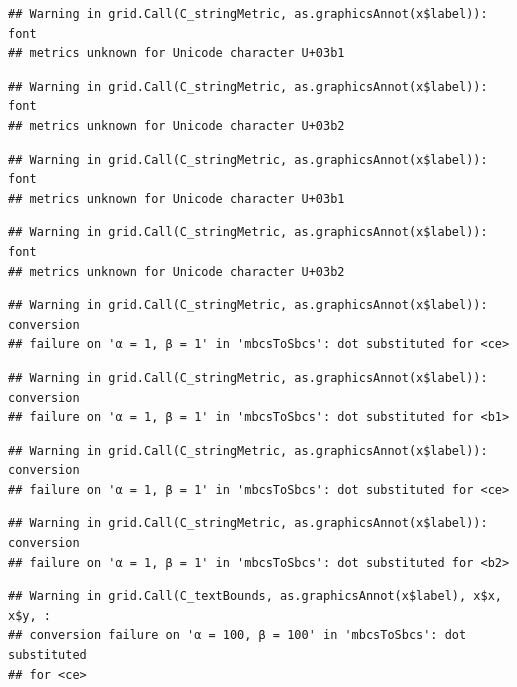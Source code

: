 \documentclass[]{book}
\theoremstyle{definition}
\theoremstyle{definition}
\theoremstyle{definition}
\theoremstyle{remark}
\begin{document}
\begin{verbatim}
## Warning in grid.Call(C_stringMetric, as.graphicsAnnot(x$label)): font
## metrics unknown for Unicode character U+03b1
\end{verbatim}

\begin{verbatim}
## Warning in grid.Call(C_stringMetric, as.graphicsAnnot(x$label)): font
## metrics unknown for Unicode character U+03b2
\end{verbatim}

\begin{verbatim}
## Warning in grid.Call(C_stringMetric, as.graphicsAnnot(x$label)): font
## metrics unknown for Unicode character U+03b1
\end{verbatim}

\begin{verbatim}
## Warning in grid.Call(C_stringMetric, as.graphicsAnnot(x$label)): font
## metrics unknown for Unicode character U+03b2
\end{verbatim}

\begin{verbatim}
## Warning in grid.Call(C_stringMetric, as.graphicsAnnot(x$label)): conversion
## failure on 'α = 1, β = 1' in 'mbcsToSbcs': dot substituted for <ce>
\end{verbatim}

\begin{verbatim}
## Warning in grid.Call(C_stringMetric, as.graphicsAnnot(x$label)): conversion
## failure on 'α = 1, β = 1' in 'mbcsToSbcs': dot substituted for <b1>
\end{verbatim}

\begin{verbatim}
## Warning in grid.Call(C_stringMetric, as.graphicsAnnot(x$label)): conversion
## failure on 'α = 1, β = 1' in 'mbcsToSbcs': dot substituted for <ce>
\end{verbatim}

\begin{verbatim}
## Warning in grid.Call(C_stringMetric, as.graphicsAnnot(x$label)): conversion
## failure on 'α = 1, β = 1' in 'mbcsToSbcs': dot substituted for <b2>
\end{verbatim}

\begin{verbatim}
## Warning in grid.Call(C_textBounds, as.graphicsAnnot(x$label), x$x, x$y, :
## conversion failure on 'α = 100, β = 100' in 'mbcsToSbcs': dot substituted
## for <ce>
\end{verbatim}
\end{document}
